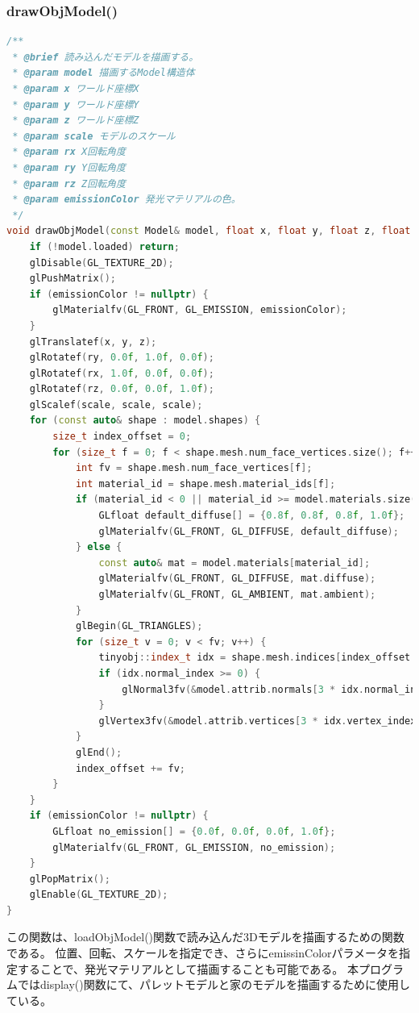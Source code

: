 \documentclass[uplatex,dvipdfmx,a4paper]{jsarticle}
\begin{document}
\hypertarget{func:drawObjModel}{}\subsubsection{drawObjModel()}\label{func:drawObjModel}
\begin{lstlisting}[language=C++, caption={drawObjModel() 関数}, label={lst:drawObjModel_detail}]
/**
 * @brief 読み込んだモデルを描画する。
 * @param model 描画するModel構造体
 * @param x ワールド座標X
 * @param y ワールド座標Y
 * @param z ワールド座標Z
 * @param scale モデルのスケール
 * @param rx X回転角度
 * @param ry Y回転角度
 * @param rz Z回転角度
 * @param emissionColor 発光マテリアルの色。
 */
void drawObjModel(const Model& model, float x, float y, float z, float scale, float rx, float ry, float rz, const GLfloat* emissionColor = nullptr) {
    if (!model.loaded) return;
    glDisable(GL_TEXTURE_2D);
    glPushMatrix();
    if (emissionColor != nullptr) {
        glMaterialfv(GL_FRONT, GL_EMISSION, emissionColor);
    }
    glTranslatef(x, y, z);
    glRotatef(ry, 0.0f, 1.0f, 0.0f);
    glRotatef(rx, 1.0f, 0.0f, 0.0f);
    glRotatef(rz, 0.0f, 0.0f, 1.0f);
    glScalef(scale, scale, scale);
    for (const auto& shape : model.shapes) {
        size_t index_offset = 0;
        for (size_t f = 0; f < shape.mesh.num_face_vertices.size(); f++) {
            int fv = shape.mesh.num_face_vertices[f];
            int material_id = shape.mesh.material_ids[f];
            if (material_id < 0 || material_id >= model.materials.size()) {
                GLfloat default_diffuse[] = {0.8f, 0.8f, 0.8f, 1.0f};
                glMaterialfv(GL_FRONT, GL_DIFFUSE, default_diffuse);
            } else {
                const auto& mat = model.materials[material_id];
                glMaterialfv(GL_FRONT, GL_DIFFUSE, mat.diffuse);
                glMaterialfv(GL_FRONT, GL_AMBIENT, mat.ambient);
            }
            glBegin(GL_TRIANGLES);
            for (size_t v = 0; v < fv; v++) {
                tinyobj::index_t idx = shape.mesh.indices[index_offset + v];
                if (idx.normal_index >= 0) {
                    glNormal3fv(&model.attrib.normals[3 * idx.normal_index]);
                }
                glVertex3fv(&model.attrib.vertices[3 * idx.vertex_index]);
            }
            glEnd();
            index_offset += fv;
        }
    }
    if (emissionColor != nullptr) {
        GLfloat no_emission[] = {0.0f, 0.0f, 0.0f, 1.0f};
        glMaterialfv(GL_FRONT, GL_EMISSION, no_emission);
    }
    glPopMatrix();
    glEnable(GL_TEXTURE_2D);
}
\end{lstlisting}
この関数は、loadObjModel()関数で読み込んだ3Dモデルを描画するための関数である。
位置、回転、スケールを指定でき、さらにemissinColorパラメータを指定することで、発光マテリアルとして描画することも可能である。
本プログラムではdisplay()関数にて、パレットモデルと家のモデルを描画するために使用している。
\end{document}
